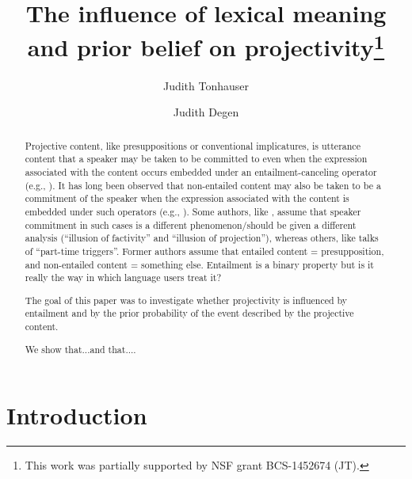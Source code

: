 \documentclass[11pt,fleqn]{article}
\title{The influence of lexical meaning and prior belief on projectivity\thanks{This work was partially supported by NSF grant BCS-1452674 (JT).}}
\author[$\bullet$]{Judith Tonhauser}
\author[$\triangleright$]{Judith Degen}
\affil[$\bullet$]{The Ohio State University}
\affil[$\triangleright$]{Stanford University}
\newcommand{\6}{\mbox{$[\hspace*{-.6mm}[$}}
\newcommand{\9}{\mbox{$]\hspace*{-.6mm}]$}}
\begin{document}
\maketitle

\begin{abstract}
Projective content, like presuppositions or conventional implicatures, is utterance content that a speaker may be taken to be committed to even when the expression associated with the content occurs embedded under an entailment-canceling operator (e.g., \citealt{ccmg90}). It has long been observed that non-entailed content may also be taken to be a commitment of the speaker when the expression associated with the content is embedded under such operators (e.g., \citealt{simons01,schlenker10,best-question}). Some authors, like \citealt{anand-hacquard2014}, assume that speaker commitment in such cases is a different phenomenon/should be given a different analysis (``illusion of factivity'' and ``illusion of projection''), whereas others, like \citealt{schlenker10} talks of ``part-time triggers''. Former authors assume that entailed content = presupposition, and non-entailed content = something else. Entailment is a binary property but is it really the way in which language users treat it?

The goal of this paper was to investigate whether projectivity is influenced by entailment and by the prior probability of the event described by the projective content.

We show that...and that....
\end{abstract}
			
\section{Introduction}\label{s1}
\end{document}
